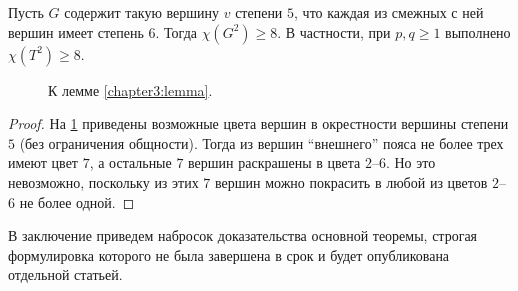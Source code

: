 \begin{lemma}\label{chapter3:lemma}
Пусть $G$ содержит такую вершину $v$ степени $5$, что каждая из смежных с ней вершин имеет степень $6$. 
Тогда $\chi(G^2) \ge 8$. В частности, при $p,q \ge 1$ выполнено $\chi(T^2) \ge 8$.
\end{lemma}

\begin{figure}[h]
\centering
\captionsetup{justification=centering}
\caption{К лемме \ref{chapter3:lemma}.}
\label{chapter3:fig:lemma}
\end{figure}

\begin{proof}
На \figurename{ \ref{chapter3:fig:lemma}} приведены возможные цвета вершин в окрестности вершины степени $5$ (без ограничения общности). 
Тогда из вершин \enquote{внешнего} пояса не более трех имеют цвет $7$, а остальные $7$ вершин раскрашены в цвета $2$--$6$. Но это невозможно, поскольку из этих $7$ вершин можно покрасить в любой из цветов $2$--$6$ не более одной. 
\end{proof}

В заключение приведем набросок доказательства основной теоремы, 
строгая формулировка которого не была завершена в срок и будет опубликована отдельной статьей.

